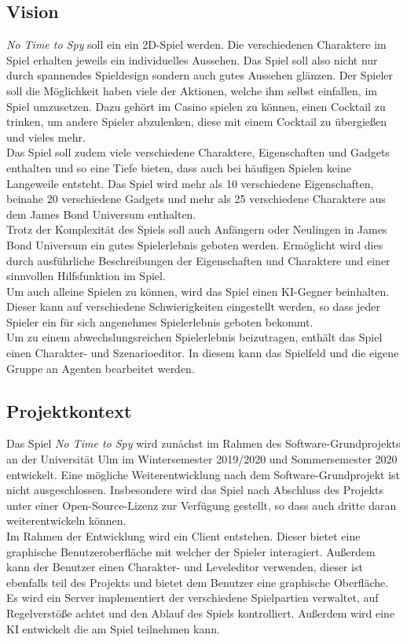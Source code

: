 \subsection{Vision}
\textit{No Time to Spy} soll ein ein 2D-Spiel werden. Die verschiedenen Charaktere im Spiel erhalten jeweils ein individuelles Aussehen. Das Spiel soll also nicht nur durch spannendes Spieldesign sondern auch gutes Aussehen glänzen. Der Spieler soll die Möglichkeit haben viele der Aktionen, welche ihm selbst einfallen, im Spiel umzusetzen. Dazu gehört im Casino spielen zu können, einen Cocktail zu trinken, um andere Spieler abzulenken, diese mit einem Cocktail zu übergießen und vieles mehr.\\
Das Spiel soll zudem viele verschiedene Charaktere, Eigenschaften und Gadgets enthalten und so eine Tiefe bieten, dass auch bei häufigen Spielen keine Langeweile entsteht. Das Spiel wird mehr als 10 verschiedene Eigenschaften, beinahe 20 verschiedene Gadgets und mehr als 25 verschiedene Charaktere aus dem James Bond Universum enthalten. \\
Trotz der Komplexität des Spiels soll auch Anfängern oder Neulingen in James Bond Universum ein gutes Spielerlebnis geboten werden. Ermöglicht wird dies durch ausführliche Beschreibungen der Eigenschaften und Charaktere und einer sinnvollen Hilfsfunktion im Spiel.\\
Um auch alleine Spielen zu können, wird das Spiel einen KI-Gegner beinhalten. Dieser kann auf verschiedene Schwierigkeiten eingestellt werden, so dass jeder Spieler ein für sich angenehmes Spielerlebnis geboten bekommt.\\
Um zu einem abwechslungsreichen Spielerlebnis beizutragen, enthält das Spiel einen Charakter- und Szenarioeditor. In diesem kann das Spielfeld und die eigene Gruppe an Agenten bearbeitet werden. 

\clearpage
\subsection{Projektkontext}
Das Spiel \textit{No Time to Spy} wird zunächst im Rahmen des Software-Grundprojekts an der Universität Ulm im Wintersemester 2019/2020 und Sommersemester 2020 entwickelt.
Eine mögliche Weiterentwicklung nach dem Software-Grundprojekt ist nicht ausgeschlossen. Insbesondere wird das Spiel nach Abschluss des Projekts unter einer Open-Source-Lizenz zur Verfügung gestellt, so dass auch dritte daran weiterentwickeln können.\\

Im Rahmen der Entwicklung wird ein Client entstehen. Dieser bietet eine graphische Benutzeroberfläche mit welcher der Spieler interagiert. Außerdem kann der Benutzer einen Charakter- und Leveleditor verwenden, dieser ist ebenfalls teil des Projekts und bietet dem Benutzer eine graphische Oberfläche.\\
Es wird ein Server implementiert der verschiedene Spielpartien verwaltet, auf Regelverstöße achtet und den Ablauf des Spiels kontrolliert. Außerdem wird eine KI entwickelt die am Spiel teilnehmen kann.

